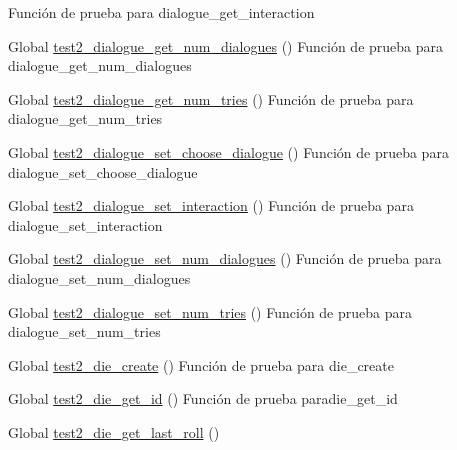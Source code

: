 \begin{DoxyRefList}
%
Función de prueba para dialogue\+\_\+get\+\_\+interaction  
\item[Global \mbox{\hyperlink{dialogue__test_8c_a5725b4c30d9351e1b7aa05239fb38abd}{test2\+\_\+dialogue\+\_\+get\+\_\+num\+\_\+dialogues}} ()]\label{test__test000040}%
%
Función de prueba para dialogue\+\_\+get\+\_\+num\+\_\+dialogues  
\item[Global \mbox{\hyperlink{dialogue__test_8c_a47aa1f5a276f6d91c591ea2f69769f83}{test2\+\_\+dialogue\+\_\+get\+\_\+num\+\_\+tries}} ()]\label{test__test000035}%
%
Función de prueba para dialogue\+\_\+get\+\_\+num\+\_\+tries  
\item[Global \mbox{\hyperlink{dialogue__test_8c_a0abdbe3e9cb7f8cdefcdaab3783866f2}{test2\+\_\+dialogue\+\_\+set\+\_\+choose\+\_\+dialogue}} ()]\label{test__test000042}%
%
Función de prueba para dialogue\+\_\+set\+\_\+choose\+\_\+dialogue  
\item[Global \mbox{\hyperlink{dialogue__test_8c_a8b4afb860f412f96ea8e0dc4e645f2ac}{test2\+\_\+dialogue\+\_\+set\+\_\+interaction}} ()]\label{test__test000047}%
%
Función de prueba para dialogue\+\_\+set\+\_\+interaction  
\item[Global \mbox{\hyperlink{dialogue__test_8c_a7cc73bd02f475226a272f54875843476}{test2\+\_\+dialogue\+\_\+set\+\_\+num\+\_\+dialogues}} ()]\label{test__test000037}%
%
Función de prueba para dialogue\+\_\+set\+\_\+num\+\_\+dialogues  
\item[Global \mbox{\hyperlink{dialogue__test_8c_ae195f173f4cbfd95cf271f77774f9984}{test2\+\_\+dialogue\+\_\+set\+\_\+num\+\_\+tries}} ()]\label{test__test000032}%
%
Función de prueba para dialogue\+\_\+set\+\_\+num\+\_\+tries  
\item[Global \mbox{\hyperlink{die__test_8c_a2508c1329b5002e3830945dd9ad7f726}{test2\+\_\+die\+\_\+create}} ()]\label{test__test000052}%
%
Función de prueba para die\+\_\+create  
\item[Global \mbox{\hyperlink{die__test_8c_a9c76572bbb86ca9138b99a010e6a184a}{test2\+\_\+die\+\_\+get\+\_\+id}} ()]\label{test__test000061}%
%
Función de prueba paradie\+\_\+get\+\_\+id  
\item[Global \mbox{\hyperlink{die__test_8c_a0832aa306964705770b2f1240763d962}{test2\+\_\+die\+\_\+get\+\_\+last\+\_\+roll}} ()]\label{test__test000059}%

\end{DoxyRefList}
